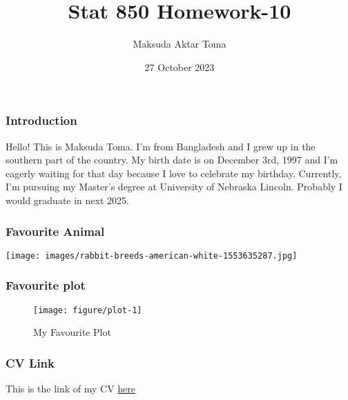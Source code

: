 \documentclass{beamer}\usepackage[]{graphicx}\usepackage[]{xcolor}
\title{Stat 850 Homework-10}
\author{Maksuda Aktar Toma}
\institute{University of Nebraska Lincoln}
\date{27 October 2023}
\newenvironment{knitrout}{}{} %
\begin{document}
\frame{\titlepage}

\begin{frame}
\frametitle{Introduction}
Hello! This is Maksuda Toma. I'm from Bangladesh and I grew up in the southern part of the country. My birth date is on December 3rd, 1997 and I'm eagerly waiting for that day because I love to celebrate my birthday. Currently, I'm pursuing my Master's degree at University of Nebraska Lincoln. Probably I would graduate in next 2025.
\end{frame}

\begin{frame}[fragile]
\frametitle{Favourite Animal}
\texttt{[image: images/rabbit-breeds-american-white-1553635287.jpg]}
\end{frame}

\begin{frame}[fragile]
\frametitle{Favourite plot}

\begin{knitrout}
\color{fgcolor}\begin{figure}
\texttt{[image: figure/plot-1]} \caption[My Favourite Plot]{My Favourite Plot}\label{fig:plot}
\end{figure}

\end{knitrout}

\end{frame}

\begin{frame}
\frametitle{CV Link}
This is the link of my CV
\href{https://maksudatoma.github.io/Maksuda_toma_CV.pdf}{here}
\end{frame}
\end{document}
